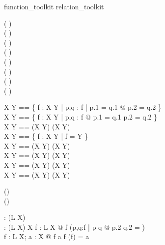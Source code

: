 \begin{zsection}
  \SECTION function\_toolkit \parents relation\_toolkit
\end{zsection}

\begin{zed}
   \rightassoc ( \varg \pfun  \varg )\\
   \rightassoc ( \varg \pinj  \varg )\\
   \rightassoc ( \varg \inj  \varg )\\
   \rightassoc ( \varg \psurj  \varg )\\
   \rightassoc ( \varg \surj  \varg )\\
   \rightassoc ( \varg \bij  \varg )\\
   \rightassoc ( \varg \ffun  \varg )\\
   \rightassoc ( \varg \finj  \varg )
\end{zed}

\begin{zed}
  X \pfun Y == \{ f : X \rel Y | \forall p,q : f | p.1 = q.1 @ p.2 = q.2 \}\\
  X \pinj Y == \{ f : X \rel Y | \forall p,q : f @ p.1 = q.1 \iff p.2 = q.2 \}\\ 
  X \inj Y == (X \pinj Y) \cap (X \fun Y)\\
  X \psurj Y == \{ f : X \pfun Y | \ran f = Y \}\\
  X \surj Y == (X \psurj Y) \cap (X \fun Y)\\
  X \bij Y == (X \surj Y) \cap (X \inj Y)\\
  X \ffun Y == (X \pfun Y) \cap \finset (X \cross Y)\\
  X \finj Y == (X \ffun Y) \cap (X \pinj Y)
\end{zed}

\begin{zed}
  \relation (\disjoint \varg)\\
  \relation (\varg \partition \varg)
\end{zed}

\begin{gendef}[L,X]
  \disjoint \varg : \power (L \rel \power X)\\
  \varg \partition \varg : (L \rel \power X) \rel \power X
\where
  \forall f : L \rel \power X @ \disjoint f \iff 
      (\forall p,q:f | p \neq q @ p.2 \cap q.2 = \emptyset)\\
  \forall f : L \rel \power X; a : \power X @
      f \partition a \iff \disjoint f \land \bigcap (\ran f) = a
\end{gendef}
